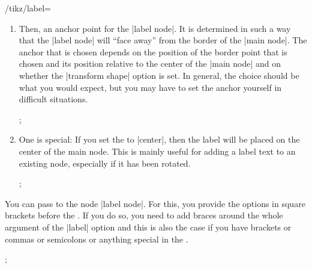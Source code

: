 \begin{key}{/tikz/label=}
\begin{enumerate}
\begin{key}{/tikz/absolute= (default true)}
      The difference can be seen in the following example:
\begin{codeexample}[]
\tikz [rotate=-80,every label/.style={draw,red}]
  ;
\end{codeexample}
\begin{codeexample}[]
\tikz [rotate=-80,every label/.style={draw,red},absolute]
  ;
\end{codeexample}
    \end{key}
  \item Then, an anchor point for the |label node|. It is determined
    in such a way that the |label node| will ``face away'' from the
    border of the |main node|. The anchor that is chosen depends on
    the position of the border point that is chosen and its position
    relative to the center of the |main node| and on whether the
    |transform shape| option is set. In general, the choice should be
    what you would expect, but you may have to set the anchor yourself
    in difficult situations.
\begin{codeexample}[]
\tikz
  ;
\end{codeexample}
  \item
    One  is special: If you set the  to
    |center|, then the label will be placed on the center of the main
    node. This is mainly useful for adding a label text to an existing
    node, especially if it has been rotated.
\begin{codeexample}[]
\tikz {};
\end{codeexample}
  \end{enumerate}

  You can pass  to the node |label node|. For this, you
  provide the options in square brackets before the . If you
  do so, you need to add braces around the whole argument of the
  |label| option and this is also the case if you have brackets or
  commas or semicolons or anything special in the .
\begin{codeexample}[]
\tikz {};
\end{codeexample}

\begin{codeexample}[]
\end{codeexample}


\end{key}
